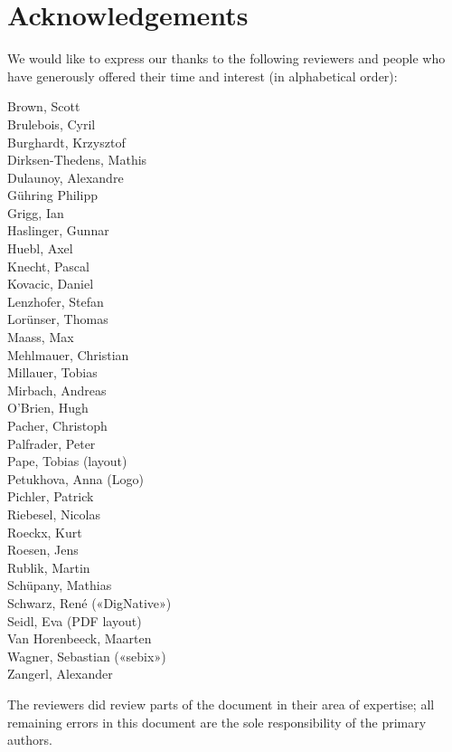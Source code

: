 \clearpage
\section*{Acknowledgements}
\label{section:Reviewers}

We would like to express our thanks to the following reviewers and people who have generously offered their time and interest (in alphabetical order):

\begin{multicols}{2}{\parskip=0pt\centering\obeylines%
Brown, Scott \\
Brulebois, Cyril \\
Burghardt, Krzysztof \\
Dirksen-Thedens, Mathis \\
Dulaunoy, Alexandre \\
Gühring Philipp  \\
Grigg, Ian  \\
Haslinger, Gunnar \\
Huebl, Axel \\
Knecht, Pascal \\
Kovacic, Daniel \\
Lenzhofer, Stefan \\
Lorünser, Thomas \\
Maass, Max \\
Mehlmauer, Christian \\
Millauer, Tobias \\
Mirbach, Andreas \\
O'Brien, Hugh \\
Pacher, Christoph \\
Palfrader, Peter \\
Pape, Tobias (layout) \\
Petukhova, Anna (Logo) \\
Pichler, Patrick \\
Riebesel, Nicolas \\
Roeckx, Kurt \\
Roesen, Jens \\
Rublik, Martin \\
Schüpany, Mathias \\
Schwarz, René («DigNative») \\
Seidl, Eva (PDF layout) \\
Van Horenbeeck, Maarten \\
Wagner, Sebastian («sebix») \\
Zangerl, Alexander \\
}\end{multicols}





The reviewers did review parts of the document in their area of
expertise; all remaining errors in this document are the sole
responsibility of the primary authors.




